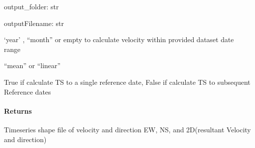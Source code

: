 \documentclass[letterpaper,10pt,english]{sphinxmanual}
\begin{document}
\begin{fulllineitems}
\sphinxAtStartPar
output\_folder: str

\sphinxAtStartPar
outputFilename: str
\begin{description}
\sphinxAtStartPar
‘year’ , “month” or empty  to calculate velocity within provided dataset date range

\sphinxAtStartPar
“mean” or “linear”

\sphinxAtStartPar
True if calculate TS to a single reference date, False if calculate TS to subsequent Reference dates

\end{description}


\paragraph{Returns}
\label{\detokenize{akhdefo_functions:id10}}
\sphinxAtStartPar
Time\sphinxhyphen{}series shape file of velocity and direction EW, NS, and 2D(resultant Velocity and direction)

\end{fulllineitems}

\end{document}
